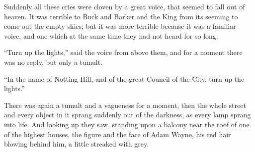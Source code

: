 \documentclass{book}
\begin{document}
Suddenly all these cries were cloven by a great voice, that seemed to fall out of heaven. It was terrible to Buck and Barker and the King from its seeming to come out the empty skies; but it was more terrible because it was a familiar voice, and one which at the same time they had not heard for so long.

“Turn up the lights,” said the voice from above them, and for a moment there was no reply, but only a tumult.

“In the name of Notting Hill, and of the great Council of the City, turn up the lights.”

There was again a tumult and a vagueness for a moment, then the whole street and every object in it sprang suddenly out of the darkness, as every lamp sprang into life. And looking up they saw, standing upon a balcony near the roof of one of the highest houses, the figure and the face of Adam Wayne, his red hair blowing behind him, a little streaked with grey.
\end{document}
